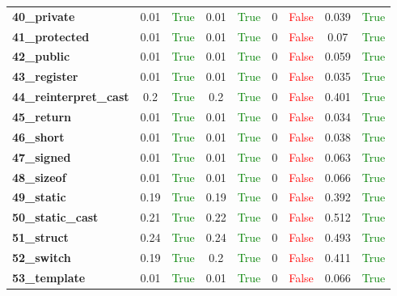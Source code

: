 \documentclass{article}
\begin{document}
\begin{xltabular}{\textwidth}{lcccccccc}
\textbf{40\_private}& 0.01&\textcolor{green}{True}& 0.01&\textcolor{green}{True}& 0&\textcolor{red}{False}& 0.039&\textcolor{green}{True} \\[0.5ex]
\textbf{41\_protected}& 0.01&\textcolor{green}{True}& 0.01&\textcolor{green}{True}& 0&\textcolor{red}{False}& 0.07&\textcolor{green}{True} \\[0.5ex]
\textbf{42\_public}& 0.01&\textcolor{green}{True}& 0.01&\textcolor{green}{True}& 0&\textcolor{red}{False}& 0.059&\textcolor{green}{True} \\[0.5ex]
\textbf{43\_register}& 0.01&\textcolor{green}{True}& 0.01&\textcolor{green}{True}& 0&\textcolor{red}{False}& 0.035&\textcolor{green}{True} \\[0.5ex]
\textbf{44\_reinterpret\_cast}& 0.2&\textcolor{green}{True}& 0.2&\textcolor{green}{True}& 0&\textcolor{red}{False}& 0.401&\textcolor{green}{True} \\[0.5ex]
\textbf{45\_return}& 0.01&\textcolor{green}{True}& 0.01&\textcolor{green}{True}& 0&\textcolor{red}{False}& 0.034&\textcolor{green}{True} \\[0.5ex]
\textbf{46\_short}& 0.01&\textcolor{green}{True}& 0.01&\textcolor{green}{True}& 0&\textcolor{red}{False}& 0.038&\textcolor{green}{True} \\[0.5ex]
\textbf{47\_signed}& 0.01&\textcolor{green}{True}& 0.01&\textcolor{green}{True}& 0&\textcolor{red}{False}& 0.063&\textcolor{green}{True} \\[0.5ex]
\textbf{48\_sizeof}& 0.01&\textcolor{green}{True}& 0.01&\textcolor{green}{True}& 0&\textcolor{red}{False}& 0.066&\textcolor{green}{True} \\[0.5ex]
\textbf{49\_static}& 0.19&\textcolor{green}{True}& 0.19&\textcolor{green}{True}& 0&\textcolor{red}{False}& 0.392&\textcolor{green}{True} \\[0.5ex]
\textbf{50\_static\_cast}& 0.21&\textcolor{green}{True}& 0.22&\textcolor{green}{True}& 0&\textcolor{red}{False}& 0.512&\textcolor{green}{True} \\[0.5ex]
\textbf{51\_struct}& 0.24&\textcolor{green}{True}& 0.24&\textcolor{green}{True}& 0&\textcolor{red}{False}& 0.493&\textcolor{green}{True} \\[0.5ex]
\textbf{52\_switch}& 0.19&\textcolor{green}{True}& 0.2&\textcolor{green}{True}& 0&\textcolor{red}{False}& 0.411&\textcolor{green}{True} \\[0.5ex]
\textbf{53\_template}& 0.01&\textcolor{green}{True}& 0.01&\textcolor{green}{True}& 0&\textcolor{red}{False}& 0.066&\textcolor{green}{True} \\[0.5ex]

\end{xltabular}
\end{document}
